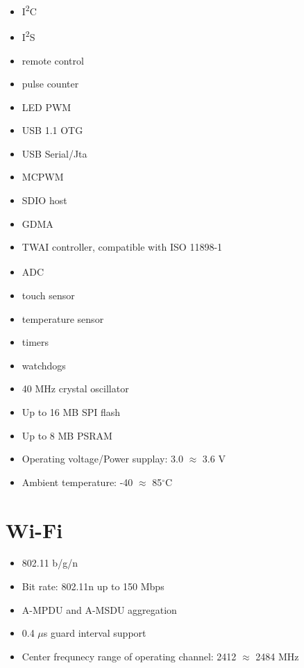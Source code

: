 \begin{itemize}
  \item I\textsuperscript{2}C
  \item I\textsuperscript{2}S
  \item remote control
  \item pulse counter
  \item LED PWM
  \item USB 1.1 OTG
  \item USB Serial/Jta
  \item MCPWM
  \item SDIO host
  \item GDMA
  \item TWAI\textsubscript{\textregistered} controller, compatible with ISO 11898-1
  \item ADC
  \item touch sensor
  \item temperature sensor
  \item timers
  \item watchdogs
  \item 40 MHz crystal oscillator
  \item Up to 16 MB SPI flash
  \item Up to 8 MB PSRAM
  \item Operating voltage/Power supplay: 3.0 $\approx$ 3.6 V
  \item Ambient temperature: -40 $\approx$ 85$^\circ$C
\end{itemize}  
    

%



\section{Wi-Fi}

\begin{itemize}
    \item 802.11 b/g/n
    \item Bit rate: 802.11n up to 150 Mbps
    \item A-MPDU and A-MSDU aggregation
    \item 0.4 $\mu$s guard interval support
    \item Center frequnecy range of operating channel: 2412 $\approx$ 2484 MHz
\end{itemize}

